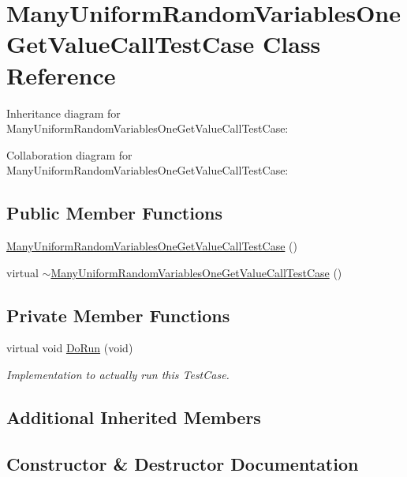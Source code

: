 \hypertarget{classManyUniformRandomVariablesOneGetValueCallTestCase}{}\section{Many\+Uniform\+Random\+Variables\+One\+Get\+Value\+Call\+Test\+Case Class Reference}
\label{classManyUniformRandomVariablesOneGetValueCallTestCase}


Inheritance diagram for Many\+Uniform\+Random\+Variables\+One\+Get\+Value\+Call\+Test\+Case\+:


Collaboration diagram for Many\+Uniform\+Random\+Variables\+One\+Get\+Value\+Call\+Test\+Case\+:
\subsection*{Public Member Functions}
\begin{DoxyCompactItemize}
\item 
\hyperlink{classManyUniformRandomVariablesOneGetValueCallTestCase_a2dd2c181444e1355c4796290da7e1747}{Many\+Uniform\+Random\+Variables\+One\+Get\+Value\+Call\+Test\+Case} ()
\item 
virtual \hyperlink{classManyUniformRandomVariablesOneGetValueCallTestCase_a673ccdd792c566258c684feab2439245}{$\sim$\+Many\+Uniform\+Random\+Variables\+One\+Get\+Value\+Call\+Test\+Case} ()
\end{DoxyCompactItemize}
\subsection*{Private Member Functions}
\begin{DoxyCompactItemize}
\item 
virtual void \hyperlink{classManyUniformRandomVariablesOneGetValueCallTestCase_a7c04f6e5e3e3e2a769183904f4291bc1}{Do\+Run} (void)
\begin{DoxyCompactList}\small\item\em Implementation to actually run this Test\+Case. \end{DoxyCompactList}\end{DoxyCompactItemize}
\subsection*{Additional Inherited Members}


\subsection{Constructor \& Destructor Documentation}

